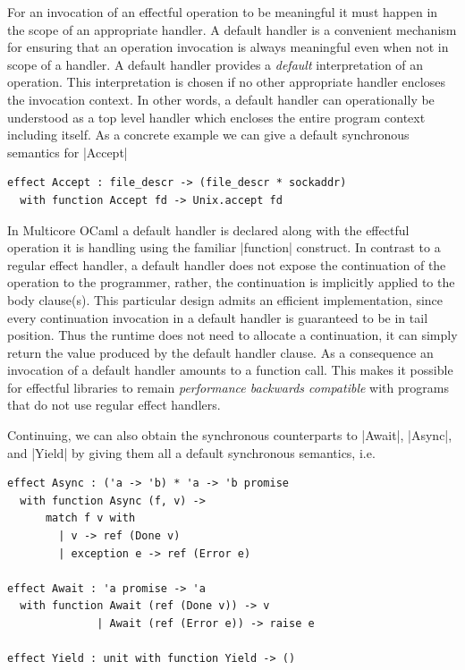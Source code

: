 \documentclass{llncs}
\begin{document}
For an invocation of an effectful operation to be meaningful it must happen in
the scope of an appropriate handler. A default handler is a convenient
mechanism for ensuring that an operation invocation is always meaningful even
when not in scope of a handler. A default handler provides a \emph{default}
interpretation of an operation. This interpretation is chosen if no other
appropriate handler encloses the invocation context. In other words, a default
handler can operationally be understood as a top level handler which encloses
the entire program context including itself.
%
As a concrete example we can give a default synchronous semantics for
|Accept|
%
\begin{lstlisting}
effect Accept : file_descr -> (file_descr * sockaddr)
  with function Accept fd -> Unix.accept fd
\end{lstlisting}
%
In Multicore OCaml a default handler is declared along with the
effectful operation it is handling using the familiar |function|
construct. In contrast to a regular effect handler, a default handler
does not expose the continuation of the operation to the programmer,
rather, the continuation is implicitly applied to the body
clause(s). This particular design admits an efficient implementation,
since every continuation invocation in a default handler is guaranteed
to be in tail position. Thus the runtime does not need to allocate a
continuation, it can simply return the value produced by the default
handler clause. As a consequence an invocation of a default handler
amounts to a function call. This makes it possible for effectful
libraries to remain \emph{performance backwards compatible} with
programs that do not use regular effect handlers.


Continuing, we can also obtain the synchronous counterparts to
|Await|, |Async|, and |Yield| by giving them all a default synchronous
semantics, i.e.
\begin{lstlisting}
effect Async : ('a -> 'b) * 'a -> 'b promise
  with function Async (f, v) ->
	  match f v with
		| v -> ref (Done v)
		| exception e -> ref (Error e)

effect Await : 'a promise -> 'a
  with function Await (ref (Done v)) -> v
              | Await (ref (Error e)) -> raise e

effect Yield : unit with function Yield -> ()
\end{lstlisting}
\end{document}
